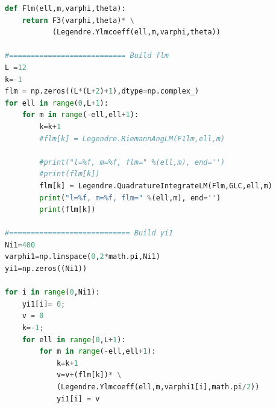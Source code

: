 \documentclass[11pt,letterpaper,titlepage]{article}
\numberwithin{equation}{section}
\begin{document}
\begin{lstlisting}[language=python]
def Flm(ell,m,varphi,theta):
    return F3(varphi,theta)* \
           (Legendre.Ylmcoeff(ell,m,varphi,theta))
           
#=========================== Build flm
L =12
k=-1
flm = np.zeros((L*(L+2)+1),dtype=np.complex_)
for ell in range(0,L+1):
    for m in range(-ell,ell+1):
        k=k+1
        #flm[k] = Legendre.RiemannAngLM(F1lm,ell,m)
        
        #print("l=%f, m=%f, flm=" %(ell,m), end='')
        #print(flm[k])
        flm[k] = Legendre.QuadratureIntegrateLM(Flm,GLC,ell,m)
        print("l=%f, m=%f, flm=" %(ell,m), end='')
        print(flm[k])

#============================ Build yi1
Ni1=400
varphi1=np.linspace(0,2*math.pi,Ni1)
yi1=np.zeros((Ni1))

for i in range(0,Ni1):
    yi1[i]= 0;
    v = 0
    k=-1;
    for ell in range(0,L+1):
        for m in range(-ell,ell+1):
            k=k+1
            v=v+(flm[k])* \
            (Legendre.Ylmcoeff(ell,m,varphi1[i],math.pi/2))
            yi1[i] = v
\end{lstlisting}



\newpage
{}
\begin{thebibliography}{1}
    
    
    
    
\end{thebibliography}
\end{document}
